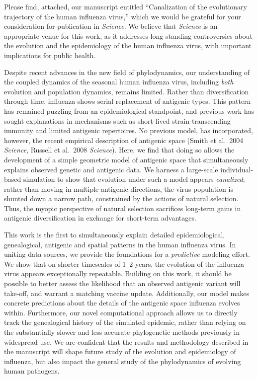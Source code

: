 \documentclass[stdletter,letterpaper,addrfromright,orderfromdateto,dateleft,11pt,noaddrto,sigleft]{newlfm}
\begin{document}
\begin{newlfm}

Please find, attached, our manuscript entitled ``Canalization of the evolutionary trajectory of the human influenza virus,'' which we would be grateful for your consideration for publication in \textit{Science}.  We believe that \textit{Science} is an appropriate venue for this work, as it addresses long-standing controversies about the evolution and the epidemiology of the human influenza virus, with important implications for public health.

Despite recent advances in the new field of phylodynamics, our understanding of the coupled dynamics of the seasonal human influenza virus, including \textit{both} evolution and population dynamics, remains limited.  Rather than diversification through time, influenza shows serial replacement of antigenic types.  This pattern has remained puzzling from an epidemiological standpoint, and previous work has sought explanations in mechanisms such as short-lived strain-transcending immunity and limited antigenic repertoires.  No previous model, has incorporated, however, the recent empirical description of antigenic space (Smith et al.\ 2004 \textit{Science}, Russell et al.\ 2008 \textit{Science}).  Here, we find that doing so allows the development of a simple geometric model of antigenic space that simultaneously explains observed genetic and antigenic data.  We harness a large-scale individual-based simulation to show that evolution under such a model appears \textit{canalized}; rather than moving in multiple antigenic directions, the virus population is shunted down a narrow path, constrained by the actions of natural selection.  Thus, the myopic perspective of natural selection sacrifices long-term gains in antigenic diversification in exchange for short-term advantages.

This work is the first to simultaneously explain detailed epidemiological, genealogical, antigenic and spatial patterns in the human influenza virus.  In uniting data sources, we provide the foundations for a \textit{predictive} modeling effort.  We show that on shorter timescales of 1--2 years, the evolution of the influenza virus appears exceptionally repeatable.  Building on this work, it should be possible to better assess the likelihood that an observed antigenic variant will take-off, and warrant a matching vaccine update.  Additionally, our model makes concrete predictions about the details of the antigenic space influenza evolves within.  Furthermore, our novel computational approach allows us to directly track the genealogical history of the simulated epidemic, rather than relying on the substantially slower and less accurate phylogenetic methods previously in widespread use.  We are confident that the results and methodology described in the manuscript will shape future study of the evolution and epidemiology of influenza, but also impact the general study of the phylodynamics of evolving human pathogens.

\end{newlfm}
\end{document}
